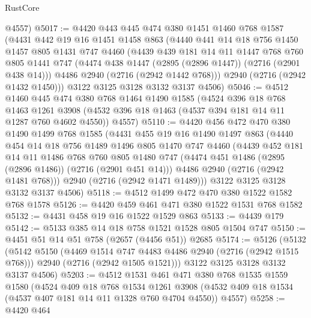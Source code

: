 \begin{lexlean}{RustCore}
\begin{coremodule}
      @4557)
@5017 := @4420
    @443
    @445
    @474
    @380
    @1451
    @1460
    @768
    @1587
    (@4431
      @442
      @19
      @16
      @1451
      @1458
      @863
      (@4440
        @441
        @14
        @18
        @756
        @1450
        @1457
        @805
        @1431
        @747
        @4460
        (@4439
          @439
          @181
          @14
          @11
          @1447
          @768
          @760
          @805
          @1441
          @747
          (@4474 @438 @1447 (@2895 (@2896 @1447)) (@2716 (@2901 @438 @14)))
          @4486
          @2940
          (@2716 (@2942 @1442 @768)))
        @2940
        (@2716 (@2942 @1432 @1450)))
      @3122
      @3125
      @3128
      @3132
      @3137
      @4506)
@5046 := @4512
    @1460
    @445
    @474
    @380
    @768
    @1464
    @1490
    @1585
    (@4524
      @396
      @18
      @768
      @1463
      @1261
      @3908
      (@4532 @396 @18 @1463 (@4537 @394 @181 @14 @11 @1287 @760 @4602 @4550))
      @4557)
@5110 := @4420
    @456
    @472
    @470
    @380
    @1490
    @1499
    @768
    @1585
    (@4431
      @455
      @19
      @16
      @1490
      @1497
      @863
      (@4440
        @454
        @14
        @18
        @756
        @1489
        @1496
        @805
        @1470
        @747
        @4460
        (@4439
          @452
          @181
          @14
          @11
          @1486
          @768
          @760
          @805
          @1480
          @747
          (@4474 @451 @1486 (@2895 (@2896 @1486)) (@2716 (@2901 @451 @14)))
          @4486
          @2940
          (@2716 (@2942 @1481 @768)))
        @2940
        (@2716 (@2942 @1471 @1489)))
      @3122
      @3125
      @3128
      @3132
      @3137
      @4506)
@5118 := @4512 @1499 @472 @470 @380 @1522 @1582 @768 @1578
@5126 := @4420 @459 @461 @471 @380 @1522 @1531 @768 @1582
@5132 := @4431 @458 @19 @16 @1522 @1529 @863
@5133 := @4439 @179
@5142 := @5133 @385 @14 @18 @758 @1521 @1528 @805 @1504 @747
@5150 := @4451 @51 @14 @51 @758 (@2657 (@4456 @51)) @2685
@5174 := @5126
    (@5132
      (@5142
        @5150
        (@4469 @1514 @747 @4483 @4486 @2940 (@2716 (@2942 @1515 @768)))
        @2940
        (@2716 (@2942 @1505 @1521)))
      @3122
      @3125
      @3128
      @3132
      @3137
      @4506)
@5203 := @4512
    @1531
    @461
    @471
    @380
    @768
    @1535
    @1559
    @1580
    (@4524
      @409
      @18
      @768
      @1534
      @1261
      @3908
      (@4532 @409 @18 @1534 (@4537 @407 @181 @14 @11 @1328 @760 @4704 @4550))
      @4557)
@5258 := @4420
    @464

\end{coremodule}
\end{lexlean}
